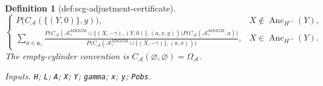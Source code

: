 \documentclass{article}
\newtheorem{definition}{Definition}
\begin{document}
\begin{definition}[def:scg-adjustment-certificate]
\[\begin{cases}
 P\bigl(C_{\mathcal A}(\{(Y,0)\},y)\bigr),
 &X\notin\operatorname{Anc}_{H^{\to}}(Y),\\[1mm]
 \displaystyle
 \sum_{a\in\mathfrak a_{\gamma}}
 \frac{P\bigl(C_{\mathcal A}(\mathcal A_{\gamma}^{\mathrm{ADGGM}}\cup
 \{(X,-\gamma),(Y,0)\},(a,x,y))\bigr)
 P\bigl(C_{\mathcal A}(\mathcal A_{\gamma}^{\mathrm{ADGGM}},a)\bigr)}
 {P\bigl(C_{\mathcal A}(\mathcal A_{\gamma}^{\mathrm{ADGGM}}\cup
 \{(X,-\gamma)\},(a,x))\bigr)},
 &X\in\operatorname{Anc}_{H^{\to}}(Y).
 \end{cases}
\]
The empty-cylinder convention is
\(C_{\mathcal A}(\varnothing,\varnothing)=\Omega_{\mathcal A}\).
\par\smallskip\noindent\emph{Inputs.} \texttt{H}; \texttt{L}; \texttt{A}; \texttt{X}; \texttt{Y}; \texttt{gamma}; \texttt{x}; \texttt{y}; \texttt{Pobs}.
\end{definition}
\end{document}
